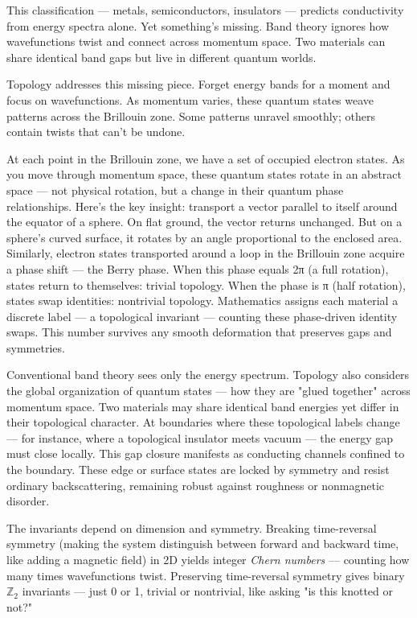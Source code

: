 This classification — metals, semiconductors, insulators — predicts conductivity from energy spectra alone. Yet something's missing. Band theory ignores how wavefunctions twist and connect across momentum space. Two materials can share identical band gaps but live in different quantum worlds.

Topology addresses this missing piece. Forget energy bands for a moment and focus on wavefunctions. As momentum varies, these quantum states weave patterns across the Brillouin zone. Some patterns unravel smoothly; others contain twists that can't be undone. 

At each point in the Brillouin zone, we have a set of occupied electron states. As you move through momentum space, these quantum states rotate in an abstract space — not physical rotation, but a change in their quantum phase relationships. Here's the key insight: transport a vector parallel to itself around the equator of a sphere. On flat ground, the vector returns unchanged. But on a sphere's curved surface, it rotates by an angle proportional to the enclosed area. Similarly, electron states transported around a loop in the Brillouin zone acquire a phase shift — the Berry phase. When this phase equals 2π (a full rotation), states return to themselves: trivial topology. When the phase is π (half rotation), states swap identities: nontrivial topology. Mathematics assigns each material a discrete label — a topological invariant — counting these phase-driven identity swaps. This number survives any smooth deformation that preserves gaps and symmetries.

Conventional band theory sees only the energy spectrum. Topology also considers the global organization of quantum states — how they are "glued together" across momentum space. Two materials may share identical band energies yet differ in their topological character. At boundaries where these topological labels change — for instance, where a topological insulator meets vacuum — the energy gap must close locally. This gap closure manifests as conducting channels confined to the boundary. These edge or surface states are locked by symmetry and resist ordinary backscattering, remaining robust against roughness or nonmagnetic disorder.

The invariants depend on dimension and symmetry. Breaking time-reversal symmetry (making the system distinguish between forward and backward time, like adding a magnetic field) in 2D yields integer \emph{Chern numbers} — counting how many times wavefunctions twist. Preserving time-reversal symmetry gives binary \(\mathbb{Z}_2\) invariants — just 0 or 1, trivial or nontrivial, like asking "is this knotted or not?"

